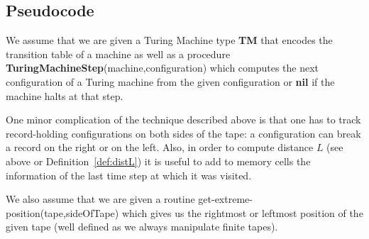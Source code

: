 \subsection{Pseudocode}

We assume that we are given a Turing Machine type \textbf{TM} that encodes the transition table of a machine as well as a procedure \textbf{TuringMachineStep}(machine,configuration) which computes the next configuration of a Turing machine from the given configuration or \textbf{nil} if the machine halts at that step.

One minor complication of the technique described above is that one has to track record-holding configurations on both sides of the tape: a configuration can break a record on the right or on the left. Also, in order to compute distance $L$ (see above or Definition~\ref{def:distL}) it is useful to add to memory cells the information of the last time step at which it was visited.

We also assume that we are given a routine {\sc get-extreme-position}(tape,sideOfTape) which gives us the rightmost or leftmost position of the given tape (well defined as we always manipulate finite tapes).

